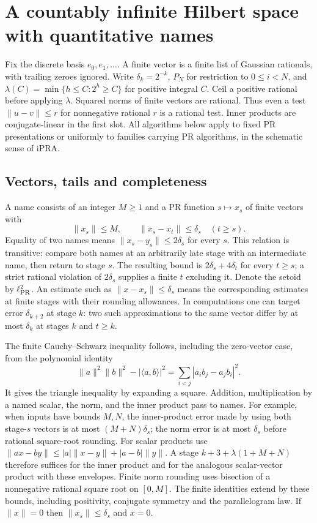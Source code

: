 \section{A countably infinite Hilbert space with quantitative names}
\label{sec:infinitehilbert}

Fix the discrete basis $e_0,e_1,\ldots$. A finite vector is a finite list of
Gaussian rationals, with trailing zeroes ignored. Write
$\delta_k=2^{-k}$, $P_N$ for restriction to $0\le i<N$, and
$\lambda(C)=\min\{h\le C:2^h\ge C\}$ for positive integral $C$.
Ceil a positive rational before applying $\lambda$. Squared norms of finite
vectors are rational. Thus even a test $\|u-v\|\le r$ for nonnegative
rational $r$ is a rational test. Inner products are conjugate-linear in the
first slot. All algorithms below apply to fixed PR presentations or uniformly
to families carrying PR algorithms, in the schematic sense of iPRA.

\subsection{Vectors, tails and completeness}

A name consists of an integer $M\ge1$ and a PR function $s\mapsto x_s$ of
finite vectors with
\[
 \|x_s\|\le M,\qquad \|x_s-x_t\|\le\delta_s\quad(t\ge s).
\]
Equality of two names means $\|x_s-y_s\|\le 2\delta_s$ for every $s$.
This relation is transitive: compare both names at an arbitrarily late
stage with an intermediate name, then return to stage $s$. The resulting
bound is $2\delta_s+4\delta_t$ for every $t\ge s$; a strict rational
violation of $2\delta_s$ supplies a finite $t$ excluding it. Denote the
setoid by $\ell^2_{\rm PR}$. An estimate such as $\|x-x_s\|\le\delta_s$
means the corresponding estimates at finite stages with their rounding
allowances. In computations one can target error $\delta_{k+2}$ at stage $k$:
two such approximations to the same vector differ by at most $\delta_k$
at stages $k$ and $t\ge k$.

The finite Cauchy--Schwarz inequality follows, including the zero-vector
case, from the polynomial identity
\[
 \|a\|^2\|b\|^2-|\langle a,b\rangle|^2
   =\sum_{i<j}|a_i b_j-a_j b_i|^2.
\]
It gives the triangle inequality by expanding a square. Addition,
multiplication by a named scalar, the norm, and the inner product pass to
names. For example, when inputs have bounds $M,N$, the inner-product
error made by using both stage-$s$ vectors is at most $(M+N)\delta_s$;
the norm error is at most $\delta_s$ before rational square-root rounding.
For scalar products use
$\|a x-b y\|\le |a|\|x-y\|+|a-b|\|y\|$. A stage
$k+3+\lambda(1+M+N)$ therefore suffices for the inner product and
for the analogous scalar-vector product with these envelopes. Finite norm
rounding uses bisection of a nonnegative rational square root on $[0,M]$.
The finite identities extend by these bounds, including positivity,
conjugate symmetry and the parallelogram law. If $\|x\|=0$ then
$\|x_s\|\le\delta_s$ and $x=0$.

